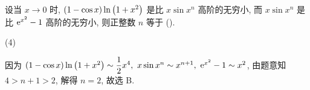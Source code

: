 \begin{example}[2001 数二]
    设当 $x\to0 $ 时, $(1-\cos x)\ln\qty(1+x^2)$ 是比 $x\sin x^n$ 高阶的无穷小, 而 $x\sin x^n$ 是比 $\mathrm{e} ^{x^2}-1$ 高阶的无穷小, 则正整数 $n$ 等于 (\quad).
    \begin{tasks}(4)
    \end{tasks}
\end{example}
\begin{solution}
    因为 $(1-\cos x)\ln\qty(1+x^2)\sim\dfrac{1}{2}x^4,~x\sin x^n\sim x^{n+1},~\mathrm{e} ^{x^2}-1\sim x^2$, 由题意知 $4>n+1>2$, 解得 $n=2$, 故选 B.
\end{solution}